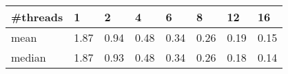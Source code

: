 \begin{tabu}{l|XXXXXXX}
\#threads&1 &2 &4 &6 &8 &12 &16 \\
\hline
mean &1.87 &0.94 &0.48 &0.34 &0.26 &0.19 &0.15 \\
median &1.87 &0.93 &0.48 &0.34 &0.26 &0.18 &0.14 \\
\end{tabu}
